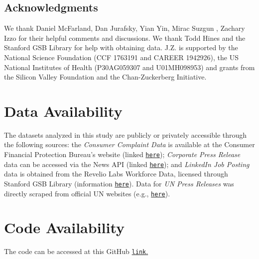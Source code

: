 
\subsection*{Acknowledgments}
We thank Daniel McFarland, Dan Jurafsky, Yian Yin, Mirac Suzgun , Zachary Izzo for their helpful comments and discussions. We thank Todd Hines and the Stanford GSB Library for help with obtaining data. J.Z. is supported by the National Science Foundation (CCF 1763191 and CAREER 1942926), the US National Institutes of Health (P30AG059307 and U01MH098953) and grants from the Silicon Valley Foundation and the Chan-Zuckerberg Initiative. 





\section*{Data Availability}

The datasets analyzed in this study are publicly or privately accessible through the following sources: the \textit{Consumer Complaint Data} is available at the Consumer Financial Protection Bureau’s website (linked \href{https://www.consumerfinance.gov/data-research/consumer-complaints/}{\texttt{{here}}}); \textit{Corporate Press Release} data can be accessed via the News API (linked \href{https://www.newsapi.ai/}{\texttt{here}}); and \textit{LinkedIn Job Posting} data is obtained from the Revelio Labs Workforce Data, licensed through Stanford GSB Library (information \href{https://www.data-dictionary.reveliolabs.com/}{\texttt{here}}). Data for \textit{UN Press Releases} was directly scraped from official UN websites (e.g., \href{https://china.un.org/en/press-centre/press-releases}{\texttt{{here}}}).









\section*{Code Availability}

The code can be accessed at this GitHub \href{https://github.com/Weixin-Liang/LLM-widespread-adoption-impact}{\texttt{link}.}

